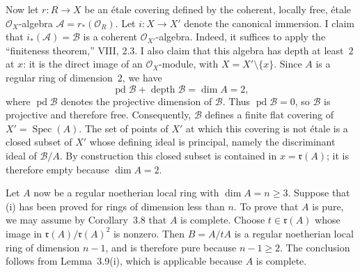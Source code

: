 \documentclass[10pt,a4paper]{article}
\newcommand{\Spec}{\operatorname{Spec}}
\newcommand{\depthop}{\operatorname{depth}}
\newcommand{\pdop}{\operatorname{pd}}
\begin{document}
Now let $r\colon R\longrightarrow X$ be an \'{e}tale covering defined by
the coherent, locally free, \'{e}tale $\mathcal O_X$-algebra
$\mathcal A=r_*(\mathcal O_R)$. Let $i\colon X\longrightarrow X'$ denote
the canonical immersion. I claim that
$i_*(\mathcal A)=\mathcal B$ is a coherent $\mathcal O_{X'}$-algebra.
Indeed, it suffices to apply the ``finiteness theorem,'' VIII, 2.3. I also
claim that this algebra has depth at least~$2$ at $x$: it is the direct image
of an $\mathcal O_X$-module, with $X=X'\setminus\{x\}$. Since $A$ is a
regular ring of dimension~$2$, we have
\[
  \pdop \mathcal B+\depthop \mathcal B=\dim A=2,
\]
where $\pdop \mathcal B$ denotes the projective dimension of $\mathcal B$.
Thus $\pdop \mathcal B=0$, so $\mathcal B$ is projective and therefore
free. Consequently, $\mathcal B$ defines a finite flat covering of
$X'=\Spec(A)$. The set of points of $X'$ at which this covering is not
\'{e}tale is a closed subset of $X'$ whose defining ideal is principal,
namely the discriminant ideal of $\mathcal B/A$. By construction this closed
subset is contained in $x=\mathfrak r(A)$; it is therefore empty because
$\dim A=2$.

Let $A$ now be a regular noetherian local ring with $\dim A=n\geq 3$.
Suppose that \textup{(i)} has been proved for rings of dimension less than
$n$. To prove that $A$ is pure, we may assume by Corollary~3.8 that $A$ is
complete. Choose $t\in\mathfrak r(A)$ whose image in
$\mathfrak r(A)/\mathfrak r(A)^2$ is nonzero. Then $B=A/tA$ is a regular
noetherian local ring of dimension $n-1$, and is therefore pure because
$n-1\geq 2$. The conclusion follows from Lemma~3.9\textup{(i)}, which is
applicable because $A$ is complete.
\end{document}
